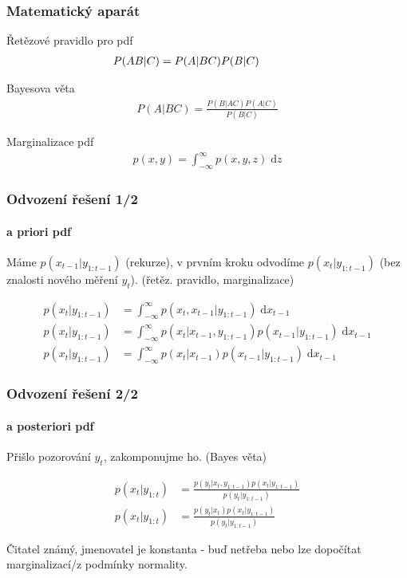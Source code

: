 \documentclass[12pt]{beamer}
\begin{document}
\begin{frame}
	\frametitle{Matematický aparát}
	\begin{block}{Řetězové pravidlo pro pdf}
		\begin{align*}
			\hspace{-1cm}
			P(AB|C) &= P(A|BC) P(B|C)
		\end{align*}
	\end{block}

	\begin{block}{Bayesova věta}
		\begin{align*}
			P(A|BC) = \frac{P(B|AC)P(A|C)}{P(B|C)}
		\end{align*}
	\end{block}

	\begin{block}{Marginalizace pdf}
		\begin{align*}
			p(x, y) = \int_{-\infty}^{\infty} p(x, y, z) \; \mathrm{d} z
		\end{align*}
	\end{block}
\end{frame}

\begin{frame}
	\frametitle{Odvození řešení 1/2}
	\framesubtitle{a priori pdf}

	Máme \(p(x_{t-1} | y_{1:t-1})\) (rekurze), v prvním kroku odvodíme \(p(x_t | y_{1:t-1})\) 
	(bez znalosti nového měření \(y_t\)). (řetěz. pravidlo, marginalizace)

	\begin{align*}
		p(x_t | y_{1:t-1}) &= \int_{-\infty}^{\infty} p(x_t, x_{t-1} | y_{1:t-1}) \; \mathrm{d} x_{t-1} \\
		p(x_t | y_{1:t-1}) &= \int_{-\infty}^{\infty} p(x_t | x_{t-1}, y_{1:t-1}) p(x_{t-1} | y_{1:t-1}) \; \mathrm{d} x_{t-1} \\
		p(x_t | y_{1:t-1}) &= \int_{-\infty}^{\infty} p(x_t | x_{t-1}) p(x_{t-1} | y_{1:t-1}) \; \mathrm{d} x_{t-1}
	\end{align*}
\end{frame}

\begin{frame}
	\frametitle{Odvození řešení 2/2}
	\framesubtitle{a posteriori pdf}

	Přišlo pozorování \(y_t\), zakomponujme ho. (Bayes věta)

	\begin{align*}
		p(x_t | y_{1:t}) &= \frac{p(y_t | x_t, y_{1:t-1}) p(x_t | y_{1:t-1})}{p(y_t | y_{1:t-1})} \\
		p(x_t | y_{1:t}) &= \frac{p(y_t | x_t) p(x_t | y_{1:t-1})}{p(y_t | y_{1:t-1})}
	\end{align*}

	Čitatel známý, jmenovatel je konstanta - buď netřeba nebo lze dopočítat marginalizací/z podmínky
	normality.
\end{frame}
\end{document}

